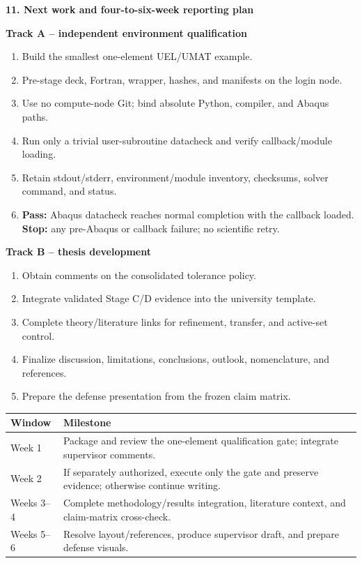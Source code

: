\documentclass[10pt,a4paper]{article}
\newcommand{\boxx}[2]{\colorbox{#1}{\parbox{\dimexpr\linewidth-2\fboxsep}{#2}}}
\newcommand{\headx}[1]{{\color{navy}\LARGE\bfseries #1}\par\vspace{1mm}{\color{blue}\rule{\linewidth}{1.1pt}}\vspace{2mm}}
\begin{document}
\clearpage
\headx{11. Next work and four-to-six-week reporting plan}
\begin{minipage}[t]{.48\linewidth}
\boxx{pb}{\textbf{\color{blue}Track A -- independent environment qualification}
\begin{enumerate}
\item Build the smallest one-element UEL/UMAT example.
\item Pre-stage deck, Fortran, wrapper, hashes, and manifests on the login node.
\item Use no compute-node Git; bind absolute Python, compiler, and Abaqus paths.
\item Run only a trivial user-subroutine datacheck and verify callback/module loading.
\item Retain stdout/stderr, environment/module inventory, checksums, solver command, and status.
\item \textbf{Pass:} Abaqus datacheck reaches normal completion with the callback loaded. \textbf{Stop:} any pre-Abaqus or callback failure; no scientific retry.
\end{enumerate}}
\end{minipage}\hfill
\begin{minipage}[t]{.48\linewidth}
\boxx{pg}{\textbf{\color{green}Track B -- thesis development}
\begin{enumerate}
\item Obtain comments on the consolidated tolerance policy.
\item Integrate validated Stage C/D evidence into the university template.
\item Complete theory/literature links for refinement, transfer, and active-set control.
\item Finalize discussion, limitations, conclusions, outlook, nomenclature, and references.
\item Prepare the defense presentation from the frozen claim matrix.
\end{enumerate}}
\end{minipage}

\vspace{3mm}
\begin{tabularx}{\linewidth}{@{}p{22mm}X@{}}\toprule
Window & Milestone\\\midrule
Week 1 & Package and review the one-element qualification gate; integrate supervisor comments.\\
Week 2 & If separately authorized, execute only the gate and preserve evidence; otherwise continue writing.\\
Weeks 3--4 & Complete methodology/results integration, literature context, and claim-matrix cross-check.\\
Weeks 5--6 & Resolve layout/references, produce supervisor draft, and prepare defense visuals.\\\bottomrule
\end{tabularx}
\end{document}
